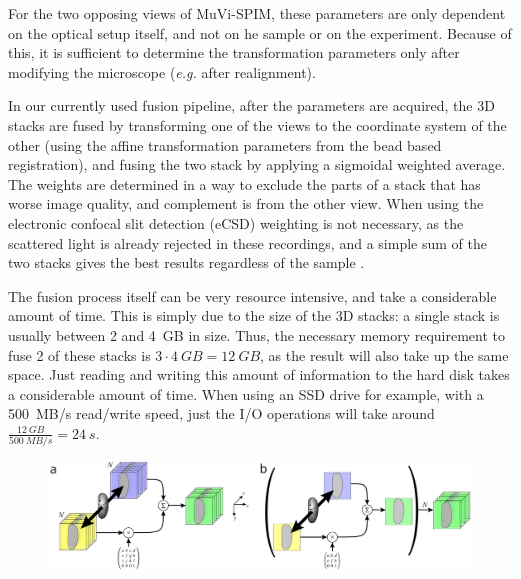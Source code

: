 For the two opposing views of MuVi-SPIM, these parameters are only dependent on the optical setup itself, and not on he sample or on the experiment. Because of this, it is sufficient to determine the transformation parameters only after modifying the microscope (\textit{e.g.} after realignment).

In our currently used fusion pipeline, after the parameters are acquired, the 3D stacks are fused by transforming one of the views to the coordinate system of the other (using the affine transformation parameters from the bead based registration), and fusing the two stack by applying a sigmoidal weighted average. The weights are determined in a way to exclude the parts of a stack that has worse image quality, and complement is from the other view. When using the electronic confocal slit detection (eCSD) weighting is not necessary, as the scattered light is already rejected in these recordings, and a simple sum of the two stacks gives the best results regardless of the sample \cite{de_medeiros_confocal_2015}.

The fusion process itself can be very resource intensive, and take a considerable amount of time. This is simply due to the size of the 3D stacks: a single stack is usually between 2 and \SI{4}{GB} in size. Thus, the necessary memory requirement to fuse 2 of these stacks is $3\cdot \SI{4}{GB} = \SI{12}{GB}$, as the result will also take up the same space. Just reading and writing this amount of information to the hard disk takes a considerable amount of time. When using an SSD drive for example, with a \SI{500}{MB/s} read/write speed, just the I/O operations will take around $\frac{\SI{12}{GB}}{\SI{500}{MB/s}} = \SI{24}{s}$.


\begin{figure}
  \centering
  \includegraphics[width=1\columnwidth]{fusion/acquisition}
  \label{fig:acquisition}
\end{figure}

